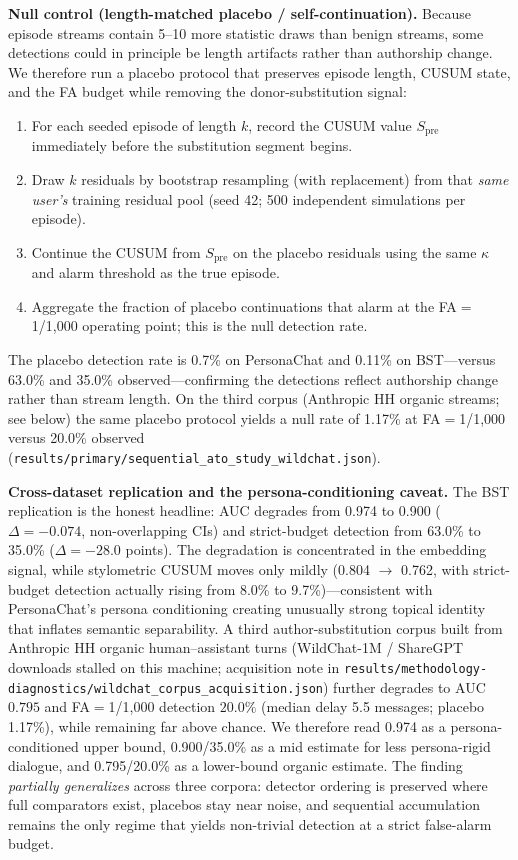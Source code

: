 \documentclass[conference]{IEEEtran}
\begin{document}
\textbf{Null control (length-matched placebo / self-continuation).}
Because episode streams contain 5--10 more statistic draws than benign streams, some
detections could in principle be length artifacts rather than authorship change.
We therefore run a placebo protocol that preserves episode length, CUSUM state, and
the FA budget while removing the donor-substitution signal:
\begin{enumerate}[noitemsep]
  \item For each seeded episode of length $k$, record the CUSUM value
        $S_{\mathrm{pre}}$ immediately before the substitution segment begins.
  \item Draw $k$ residuals by bootstrap resampling (with replacement) from that
        \emph{same user's} training residual pool (seed 42; 500 independent
        simulations per episode).
  \item Continue the CUSUM from $S_{\mathrm{pre}}$ on the placebo residuals using
        the same $\kappa$ and alarm threshold as the true episode.
  \item Aggregate the fraction of placebo continuations that alarm at the
        FA$=$1/1{,}000 operating point; this is the null detection rate.
\end{enumerate}
The placebo detection rate is 0.7\% on PersonaChat and 0.11\% on BST---versus
63.0\% and 35.0\% observed---confirming the detections reflect authorship change
rather than stream length.
On the third corpus (Anthropic HH organic streams; see below) the same placebo
protocol yields a null rate of 1.17\% at FA$=$1/1{,}000 versus 20.0\% observed
(\texttt{results/primary/sequential\_ato\_study\_wildchat.json}).

\textbf{Cross-dataset replication and the persona-conditioning caveat.}
The BST replication is the honest headline: AUC degrades from 0.974 to 0.900
($\Delta{=}{-}0.074$, non-overlapping CIs) and strict-budget detection from 63.0\%
to 35.0\% ($\Delta{=}{-}28.0$ points).
The degradation is concentrated in the embedding signal, while stylometric CUSUM
moves only mildly (0.804 $\to$ 0.762, with strict-budget detection actually rising
from 8.0\% to 9.7\%)---consistent with PersonaChat's persona conditioning creating
unusually strong topical identity that inflates semantic separability.
A third author-substitution corpus built from Anthropic HH organic
human--assistant turns (WildChat-1M / ShareGPT downloads stalled on this
machine; acquisition note in \texttt{results/methodology-diagnostics/wildchat\_corpus\_acquisition.json})
further degrades to AUC $0.795$ and FA$=$1/1{,}000 detection $20.0\%$
(median delay 5.5 messages; placebo 1.17\%), while remaining far above chance.
We therefore read 0.974 as a persona-conditioned upper bound, 0.900/35.0\% as a
mid estimate for less persona-rigid dialogue, and 0.795/20.0\% as a lower-bound
organic estimate.
The finding \emph{partially generalizes} across three corpora: detector ordering
is preserved where full comparators exist, placebos stay near noise, and
sequential accumulation remains the only regime that yields non-trivial detection
at a strict false-alarm budget.
\end{document}
